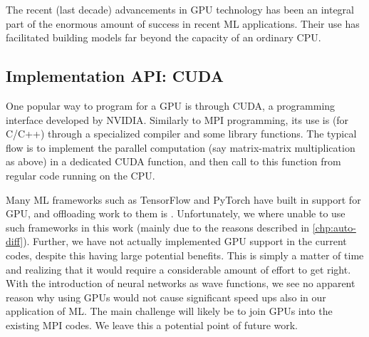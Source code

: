 \documentclass[Thesis.tex]{subfiles}
\begin{document}
The recent (last decade) advancements in GPU technology has been an integral
part of the enormous amount of success in recent ML applications. Their use has
facilitated building models far beyond the capacity of an ordinary CPU.

\subsection{Implementation API: CUDA}

One popular way to program for a GPU is through CUDA, a programming
interface developed by NVIDIA. Similarly to MPI programming, its use is (for
C/C++) through a specialized compiler and some library functions. The typical
flow is to implement the parallel computation (say matrix-matrix multiplication
as above) in a dedicated CUDA function, and then call to this function from
regular code running on the CPU.

Many ML frameworks such as TensorFlow and PyTorch have built in support for GPU,
and offloading work to them is . Unfortunately, we where unable to
use such frameworks in this work (mainly due to the reasons described in
\cref{chp:auto-diff}). Further, we have not actually implemented GPU support in
the current codes, despite this having large potential benefits. This is simply
a matter of time and realizing that it would require a considerable amount of effort
to get right. With the introduction of neural networks as wave functions, we see
no apparent reason why using GPUs would not cause significant speed ups also in
our application of ML. The main challenge will likely be to join GPUs into the
existing MPI codes. We leave this a potential point of future work.
\end{document}
